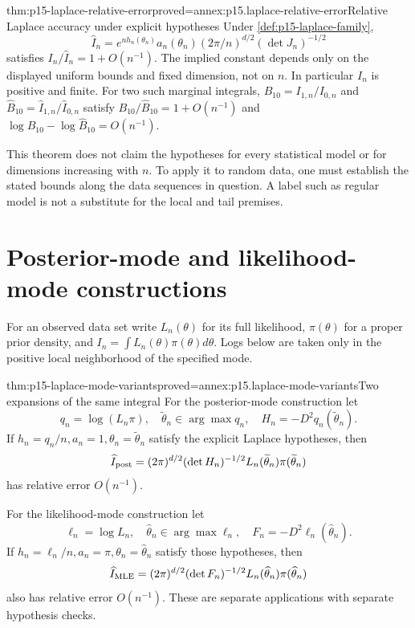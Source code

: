 \begin{hbtheorem}{thm:p15-laplace-relative-error}{proved=annex:p15.laplace-relative-error}{Relative Laplace accuracy under explicit hypotheses}
Under \cref{def:p15-laplace-family},
\[
 \widehat I_n=e^{nh_n(\theta_n)}a_n(\theta_n)
                  (2\pi/n)^{d/2}(\det J_n)^{-1/2}
\]
satisfies \(I_n/\widehat I_n=1+O(n^{-1})\).
The implied constant depends only on the displayed uniform bounds and
fixed dimension, not on \(n\). In particular \(I_n\) is positive and finite.
For two such marginal integrals,
\(B_{10}=I_{1,n}/I_{0,n}\) and
\(\widehat B_{10}=\widehat I_{1,n}/\widehat I_{0,n}\) satisfy
\(B_{10}/\widehat B_{10}=1+O(n^{-1})\) and
\(\log B_{10}-\log\widehat B_{10}=O(n^{-1})\).
\end{hbtheorem}

This theorem does not claim the hypotheses for every statistical model or
for dimensions increasing with \(n\). To apply it to random data, one must
establish the stated bounds along the data sequences in question. A label
such as regular model is not a substitute for the local and tail premises.

\section{Posterior-mode and likelihood-mode constructions}
\label{sec:p15-laplace-mode-variants}

For an observed data set write \(L_n(\theta)\) for its full likelihood,
\(\pi(\theta)\) for a proper prior density, and
\(I_n=\int L_n(\theta)\pi(\theta)d\theta\). Logs below are taken only in
the positive local neighborhood of the specified mode.

\begin{hbcorollary}{thm:p15-laplace-mode-variants}{proved=annex:p15.laplace-mode-variants}{Two expansions of the same integral}
For the posterior-mode construction let
\[
 q_n=\log(L_n\pi),\quad \widetilde\theta_n\in\arg\max q_n,\quad
 H_n=-D^2q_n(\widetilde\theta_n).
\]
If \(h_n=q_n/n,a_n=1,\theta_n=\widetilde\theta_n\) satisfy the explicit
Laplace hypotheses, then
\[
 \widehat I_{\rm post}
 =(2\pi)^{d/2}(\det H_n)^{-1/2}
                L_n(\widetilde\theta_n)\pi(\widetilde\theta_n)
\]
has relative error \(O(n^{-1})\).

For the likelihood-mode construction let
\[
 \ell_n=\log L_n,\quad \widehat\theta_n\in\arg\max\ell_n,\quad
 F_n=-D^2\ell_n(\widehat\theta_n).
\]
If \(h_n=\ell_n/n,a_n=\pi,\theta_n=\widehat\theta_n\) satisfy those
hypotheses, then
\[
 \widehat I_{\rm MLE}
 =(2\pi)^{d/2}(\det F_n)^{-1/2}
                  L_n(\widehat\theta_n)\pi(\widehat\theta_n)
\]
also has relative error \(O(n^{-1})\). These are separate applications
with separate hypothesis checks.
\end{hbcorollary}

